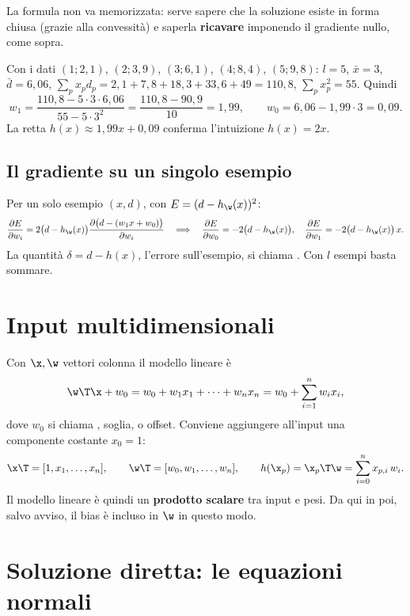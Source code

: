 \begin{attenzione}
La formula non va memorizzata: serve sapere che la soluzione esiste in forma chiusa (grazie alla convessità) e
saperla \textbf{ricavare} imponendo il gradiente nullo, come sopra.
\end{attenzione}

\begin{esempio}
Con i dati $(1;2{,}1)$, $(2;3{,}9)$, $(3;6{,}1)$, $(4;8{,}4)$, $(5;9{,}8)$: $l=5$, $\bar x = 3$,
$\bar d = 6{,}06$, $\sum_px_pd_p = 2{,}1+7{,}8+18{,}3+33{,}6+49 = 110{,}8$, $\sum_px_p^2 = 55$. Quindi
\[
w_1 = \frac{110{,}8 - 5\cdot3\cdot6{,}06}{55-5\cdot3^2} = \frac{110{,}8-90{,}9}{10} = 1{,}99, \qquad
w_0 = 6{,}06 - 1{,}99\cdot3 = 0{,}09 .
\]
La retta $h(x)\approx1{,}99x+0{,}09$ conferma l'intuizione $h(x)=2x$.
\end{esempio}

\subsection{Il gradiente su un singolo esempio}

Per un solo esempio $(x,d)$, con $E = (d-h_\w(x))^2$:
\[
\frac{\partial E}{\partial w_i} = 2\big(d-h_\w(x)\big)\frac{\partial\big(d-(w_1x+w_0)\big)}{\partial w_i}
\quad\Longrightarrow\quad
\frac{\partial E}{\partial w_0} = -2\big(d-h_\w(x)\big),\quad \frac{\partial E}{\partial w_1} = -2\big(d-h_\w(x)\big)\,x .
\]
La quantità $\delta = d-h(x)$, l'errore sull'esempio, si chiama . Con $l$ esempi basta sommare.

\section{Input multidimensionali}

Con $\x,\w$ vettori colonna il modello lineare è
\[
\w\T\x + w_0 = w_0 + w_1x_1 + \dots + w_nx_n = w_0 + \sum_{i=1}^n w_ix_i ,
\]
dove $w_0$ si chiama , soglia,  o offset. Conviene aggiungere all'input una
componente costante $x_0=1$:
\begin{equation}\label{eq:bias-incluso}
\x\T = [1,x_1,\dots,x_n],\qquad \w\T = [w_0,w_1,\dots,w_n],\qquad
h(\x_p) = \x_p\T\w = \sum_{i=0}^{n}x_{p,i}\,w_i .
\end{equation}
Il modello lineare è quindi un \textbf{prodotto scalare} tra input e pesi. Da qui in poi, salvo avviso, il bias è
incluso in $\w$ in questo modo.

\section{Soluzione diretta: le equazioni normali}
\label{sec:equazioni-normali}

